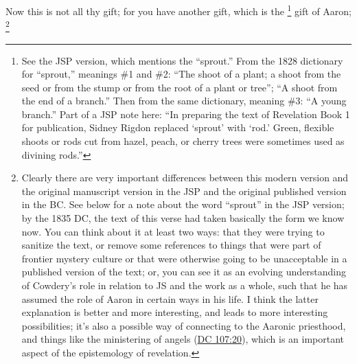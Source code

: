 		Now this is not all thy gift; for you have another gift, which is the
			\footnote{%
				See the JSP version, which mentions the ``sprout.'' From the 1828 dictionary for ``sprout,'' meanings \#1 and \#2: ``The shoot of a plant; a shoot from the seed or from the stump or from the root of a plant or tree''; ``A shoot from the end of a branch.'' Then from the same dictionary, meaning \#3: ``A young branch.'' Part of a JSP note here: ``In preparing the text of Revelation Book 1 for publication, Sidney Rigdon replaced `sprout' with `rod.' Green, flexible shoots or rods cut from hazel, peach, or cherry trees were sometimes used as divining rods.''
				}%
		gift of Aaron;%
		\footnote{%
			Clearly there are very important differences between this modern version and the original manuscript version in the JSP and the original published version in the BC. See below for a note about the word ``sprout'' in the JSP version; by the 1835 DC, the text of this verse had taken basically the form we know now. You can think about it at least two ways: that they were trying to sanitize the text, or remove some references to things that were part of frontier mystery culture or that were otherwise going to be unacceptable in a published version of the text; or, you can see it as an evolving understanding of Cowdery's role in relation to JS and the work as a whole, such that he has assumed the role of Aaron in certain ways in his life. I think the latter explanation is better and more interesting, and leads to more interesting possibilities; it's also a possible way of connecting to the Aaronic priesthood, and things like the ministering of angels (\hyperref[DC107-20]{DC 107:20}), which is an important aspect of the epistemology of revelation.
			
}
